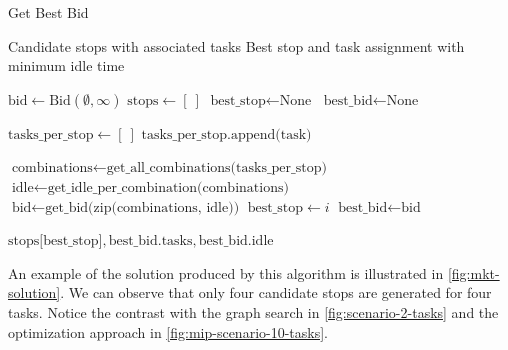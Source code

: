 \begin{algorithm}[H]
    \caption{Get Best Bid}
    \label{alg:get-best-bid}
    \begin{algorithmic}[1]
        \REQUIRE Candidate stops with associated tasks
        \ENSURE Best stop and task assignment with minimum idle time

        \STATE $\text{bid} \gets \text{Bid}(\emptyset, \infty)$
        \STATE $\text{stops} \gets [\ ]$
        \STATE $\text{best\_stop} \gets \text{None}$
        \STATE $\text{best\_bid} \gets \text{None}$

        \STATE $\text{tasks\_per\_stop} \gets [\ ]$
        \STATE $\text{tasks\_per\_stop.append(task)}$
        \ENDFOR

        \STATE $\text{combinations} \gets \text{get\_all\_combinations(tasks\_per\_stop)}$
        \STATE $\text{idle} \gets \text{get\_idle\_per\_combination(combinations)}$
        \STATE $\text{bid} \gets \text{get\_bid(zip(combinations, idle))}$
        \STATE $\text{best\_stop} \gets i$
        \STATE $\text{best\_bid} \gets \text{bid}$
        \ENDIF
        \ENDFOR

        \RETURN $\text{stops[best\_stop]}, \text{best\_bid.tasks}, \text{best\_bid.idle}$
    \end{algorithmic}
\end{algorithm}


An example of the solution produced by this algorithm is illustrated in \autoref{fig:mkt-solution}. We can observe that only four candidate stops are generated for four tasks. Notice the contrast with the graph search in \autoref{fig:scenario-2-tasks} and the optimization approach in \autoref{fig:mip-scenario-10-tasks}.

